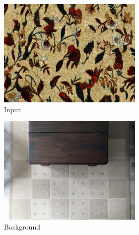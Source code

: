 \begin{figure}[]
    \begin{subfigure}{\textwidth}
        \centering
        \begin{subfigure}{0.24\textwidth}
            \centering
            \includegraphics[width=\textwidth]{images/04-experiment02/carpet/flowers2/target.jpg}
            \caption*{Input}
        \end{subfigure}
        \hfill
        \begin{subfigure}{0.24\textwidth}
            \centering
            \includegraphics[width=\textwidth]{images/04-experiment02/carpet/bg.jpg}
            \caption*{Background}
        \end{subfigure}
        \hfill
        \begin{subfigure}{0.24\textwidth}

\end{subfigure}
\end{subfigure}
\end{figure}
